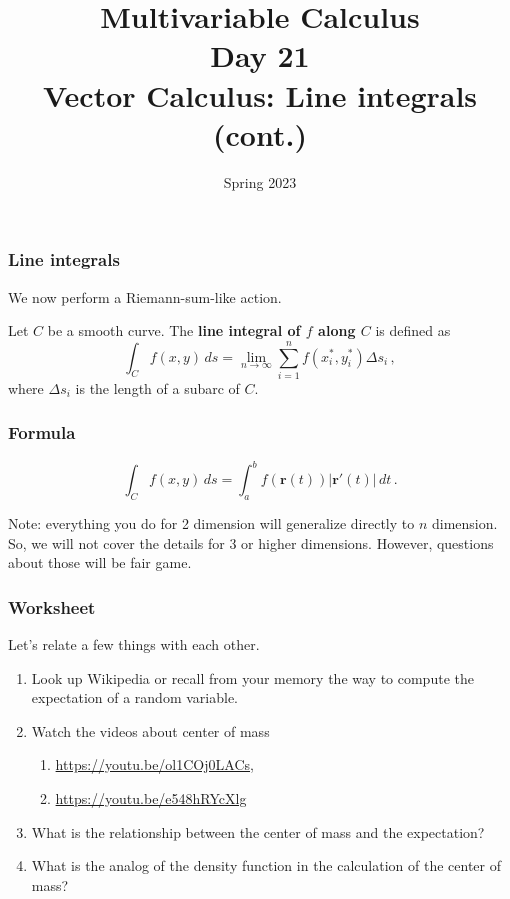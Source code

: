 \documentclass[aspectratio=169]{beamer}
\title{ Multivariable Calculus \\ Day  21 \\ Vector Calculus: Line integrals (cont.)}
\date{Spring 2023}
\begin{document}
\maketitle


\begin{frame}
    \frametitle{Line integrals}
    We now perform a Riemann-sum-like action.
    \begin{definition}
    Let $C$ be a smooth curve.
    The \textbf{line integral of $f$ along $C$} is defined as
    \begin{equation*}
        \int_C f(x,y) \, ds = \lim_{n\to \infty} \sum_{i=1}^n f(x_i^*, y_i^*) \Delta s_i \,,
    \end{equation*}
    where $\Delta s_i$ is the length of a subarc of $C$.
    \end{definition}
\end{frame}

\begin{frame}
    \frametitle{Formula}
    \begin{equation*}
        \int_C f(x,y) \, ds = \int_a^b f(\mathbf{r}(t)) |\mathbf{r}'(t)| \, dt \,.
    \end{equation*}

    Note: everything you do for 2 dimension will generalize directly to $n$ dimension. 
    So, we will not cover the details for 3 or higher dimensions. However, questions
    about those will be fair game. 
\end{frame}

\begin{frame}
    \frametitle{Worksheet}
    Let's relate a few things with each other. 
    \begin{enumerate}
        \item Look up Wikipedia or recall from your memory the way to compute the
            expectation of a random variable.
        \item Watch the videos about center of mass
            \begin{enumerate}
                \item \url{https://youtu.be/ol1COj0LACs},
                \item \url{https://youtu.be/e548hRYcXlg}
            \end{enumerate}
        \item What is the relationship between the center of mass and the expectation?
        \item What is the analog of the density function in the calculation of the center of mass?
    \end{enumerate}
\end{frame}
\end{document}
